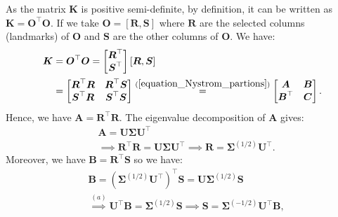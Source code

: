 \documentclass[lang=cn,10pt]{gorgeousnbook}
\numberwithin{equation}{section}%
\numberwithin{figure}{section}%
\begin{document}
As the matrix $\boldsymbol{K}$ is positive semi-definite, by definition, it can be written as $\boldsymbol{K} = \boldsymbol{O}^\top \boldsymbol{O}$. If we take $\boldsymbol{O} = [\boldsymbol{R}, \boldsymbol{S}]$ where $\boldsymbol{R}$ are the selected columns (landmarks) of $\boldsymbol{O}$ and $\boldsymbol{S}$ are the other columns of $\boldsymbol{O}$. We have:
\begin{align}
\boldsymbol{K} &= \boldsymbol{O}^\top \boldsymbol{O} = 
\begin{bmatrix}
\boldsymbol{R}^\top \\
\boldsymbol{S}^\top
\end{bmatrix}
[\boldsymbol{R}, \boldsymbol{S}] \label{equation_Nystrom_kernel_OtransposeO} \\
&= 
\begin{bmatrix}
\boldsymbol{R}^\top \boldsymbol{R} & \boldsymbol{R}^\top \boldsymbol{S} \\
\boldsymbol{S}^\top \boldsymbol{R} & \boldsymbol{S}^\top \boldsymbol{S}
\end{bmatrix}
\overset{(\ref{equation_Nystrom_partions})}{=} 
\begin{bmatrix}
\boldsymbol{A} & \boldsymbol{B} \\
\boldsymbol{B}^\top & \boldsymbol{C}
\end{bmatrix}.
\end{align}
Hence, we have $\boldsymbol{A} = \boldsymbol{R}^\top \boldsymbol{R}$. The eigenvalue decomposition \cite{ghojogh2019eigenvalue} of $\boldsymbol{A}$ gives:
\begin{align}
&\boldsymbol{A} = \boldsymbol{U} \boldsymbol{\Sigma} \boldsymbol{U}^\top \label{equation_Nystrom_A_eig_decomposition} \\
&\implies \boldsymbol{R}^\top \boldsymbol{R} = \boldsymbol{U} \boldsymbol{\Sigma} \boldsymbol{U}^\top \implies \boldsymbol{R} = \boldsymbol{\Sigma}^{(1/2)} \boldsymbol{U}^\top. \label{equation_Nystrom_R}
\end{align}
Moreover, we have $\boldsymbol{B} = \boldsymbol{R}^\top \boldsymbol{S}$ so we have:
\begin{align}
&\boldsymbol{B} = (\boldsymbol{\Sigma}^{(1/2)} \boldsymbol{U}^\top)^\top \boldsymbol{S} = \boldsymbol{U} \boldsymbol{\Sigma}^{(1/2)} \boldsymbol{S} \nonumber \\
&\overset{(a)}{\implies} \boldsymbol{U}^\top \boldsymbol{B} = \boldsymbol{\Sigma}^{(1/2)} \boldsymbol{S} \implies \boldsymbol{S} = \boldsymbol{\Sigma}^{(-1/2)} \boldsymbol{U}^\top \boldsymbol{B}, \label{equation_Nystrom_S}
\end{align}
\end{document}
